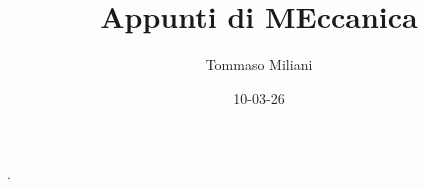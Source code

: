 \documentclass[a4paper, oneside]{article}
\title{Appunti di MEccanica}
\author{Tommaso Miliani}
\date{10-03-26}
\begin{document}
                {}          %
                {}          %
                {\slshape}  %
                {}          %
                {\bfseries} %
                {.}         %
                {\newline}  %
                {}          %
\theoremstyle{theoremEnv}

\newtheorem{definition}{Definizione}[section]
\newtheorem{theorem}{Teorema}[section]
\newtheorem{lemma}{Proposizione}[section]
\newtheorem{observation}{Osservazione}[section]
\newtheorem{corollary}{Corollario}[theorem]
\newtheorem{example}{Esempio}[section]
\newtheorem{remark}{Enunciato}[section]

\maketitle
\end{document}
